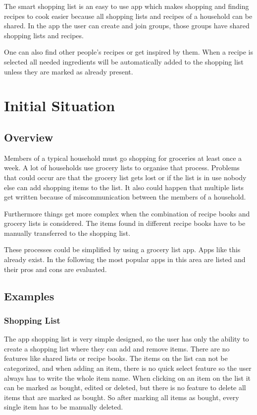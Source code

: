 \documentclass[12pt]{article}
\theoremstyle{definition}
\begin{document}
The smart shopping list is an easy to use app which makes shopping and finding recipes to cook easier because all shopping lists and recipes of a household can be shared. In the app the user can create and join groups, those groups have shared shopping lists and recipes.

One can also find other people's recipes or get inspired by them. When a recipe is selected all needed ingredients will be automatically added to the shopping list unless they are marked as already present. 

\pagebreak

\section{Initial Situation}

\subsection{Overview}

Members of a typical household must go shopping for groceries at least once a week. A lot of households use grocery lists to organise that process. Problems that could occur are that the grocery list gets lost or if the list is in use nobody else can add shopping items to the list. It also could happen that multiple lists get written because of miscommunication between the members of a household.

Furthermore things get more complex when the combination of recipe books and grocery lists is considered. The items found in different recipe books have to be manually transferred to the shopping list. 

These processes could be simplified by using a grocery list app. Apps like this already exist. In the following the most popular apps in this area are listed and their pros and cons are evaluated.

\subsection{Examples}
\subsubsection{Shopping List}
The app shopping list is very simple designed, so the user has only the ability to create a shopping list where they can add and remove items. There are no features like shared lists or recipe books. The items on the list can not be categorized, and when adding an item, there is no quick select feature so the user always has to write the whole item name. When clicking on an item on the list it can be marked as bought, edited or deleted, but there is no feature to delete all items that are marked as bought. So after marking all items as bought, every single item has to be manually deleted. 
\end{document}
